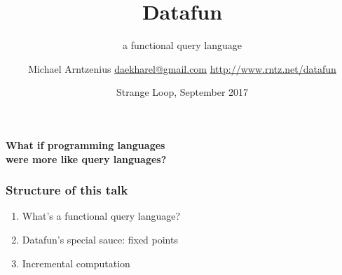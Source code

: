 \documentclass[xcolor=table]{beamer}
\title{Datafun}
\subtitle{a functional query language}
\author{Michael Arntzenius
  \newline\href{mailto:daekharel@gmail.com}{daekharel@gmail.com}
  \newline\url{http://www.rntz.net/datafun}}
\date{Strange Loop, September 2017}
\begin{document}
\maketitle


\begin{frame}\LARGE
  \center \textbf{What if programming languages\\
    were more like query languages?}
\end{frame}

\begin{frame}\Large
  \frametitle{Structure of this talk}
  \begin{enumerate}
    \itemsep 1.5em
  \item What's a functional query language?
  \item Datafun's special sauce: fixed points
  \item Incremental computation
  \end{enumerate}
\end{frame}








\end{document}
